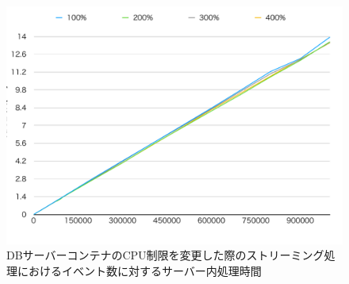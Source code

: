 \documentclass[../../../../../main]{subfiles}
\begin{document}
    \begin{figure}[H]
        \centering
        \includegraphics[width=12cm]{graph}
        \caption{DBサーバーコンテナのCPU制限を変更した際のストリーミング処理におけるイベント数に対するサーバー内処理時間}
        \label{fig:stream-change-db-cpu-limit-server-time-app_4_8192-db_1024}
    \end{figure}
\end{document}
